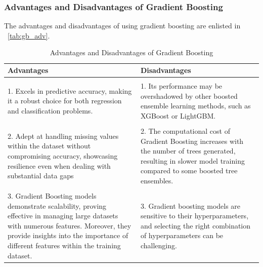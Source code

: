 \subsubsection{Advantages and Disadvantages of Gradient Boosting}
The advantages and disadvantages of using gradient boosting are enlisted in ~\autoref{tab:gb_adv}.

\begin{table}[H]
    \centering
    \caption{Advantages and Disadvantages of Gradient Boosting}
    \label{tab:gb_adv}
    \begin{tabularx}{\textwidth}{X|X}
        \hline
        \textbf{Advantages}                                                                                                                                                                                                              & \textbf{Disadvantages}                                                                                                                                                   \\
        \hline                                                                                                                                                                                                                                                                                                                                                                                                      \\
        1. Excels in predictive accuracy, making it a robust choice for both regression and classification problems.                                                                                                                     & 1. Its performance may be overshadowed by other boosted ensemble learning methods, such as XGBoost or LightGBM.                                                          \\ \\
        2. Adept at handling missing values within the dataset without compromising accuracy, showcasing resilience even when dealing with substantial data gaps                                                                         & 2. The computational cost of Gradient Boosting increases with the number of trees generated, resulting in slower model training compared to some boosted tree ensembles. \\ \\
        3. Gradient Boosting models demonstrate scalability, proving effective in managing large datasets with numerous features. Moreover, they provide insights into the importance of different features within the training dataset. & 3. Gradient boosting models are sensitive to their hyperparameters, and selecting the right combination of hyperparameters can be challenging.                           \\
        \hline
    \end{tabularx}
\end{table}
\FloatBarrier



